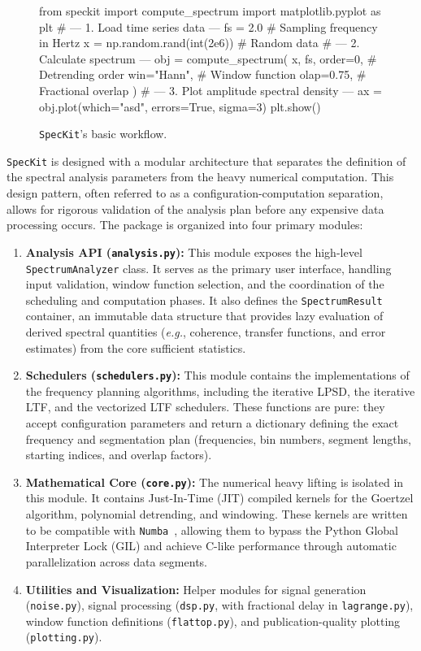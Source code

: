 \documentclass[final, 5p, times, twocolumn, number, sort&compress]{elsarticle}
\newcommand{\eg}{\textit{e.g.}}
\newcommand{\speckit}{\texttt{SpecKit}}
\begin{document}
\begin{figure}
\centering
\begin{python}
from speckit import compute_spectrum
import matplotlib.pyplot as plt
# --- 1. Load time series data ---
fs = 2.0  # Sampling frequency in Hertz
x = np.random.rand(int(2e6))  # Random data
# --- 2. Calculate spectrum ---
obj = compute_spectrum(
    x,
    fs,
    order=0,    # Detrending order
    win="Hann", # Window function
    olap=0.75,  # Fractional overlap
)
# --- 3. Plot amplitude spectral density ---
ax = obj.plot(which="asd", errors=True, sigma=3)
plt.show()
\end{python}
\caption{\speckit{}'s basic workflow.}
\label{fig:workflow}
\end{figure}

\speckit{} is designed with a modular architecture that separates the definition of the spectral analysis parameters from the heavy numerical computation. This design pattern, often referred to as a configuration-computation separation, allows for rigorous validation of the analysis plan before any expensive data processing occurs. The package is organized into four primary modules:

\begin{enumerate}
    \item \textbf{Analysis API (\texttt{analysis.py}):} This module exposes the high-level \texttt{SpectrumAnalyzer} class. It serves as the primary user interface, handling input validation, window function selection, and the coordination of the scheduling and computation phases. It also defines the \texttt{SpectrumResult} container, an immutable data structure that provides lazy evaluation of derived spectral quantities (\eg, coherence, transfer functions, and error estimates) from the core sufficient statistics.
    
    \item \textbf{Schedulers (\texttt{schedulers.py}):} This module contains the implementations of the frequency planning algorithms, including the iterative LPSD, the iterative LTF, and the vectorized LTF schedulers. These functions are pure: they accept configuration parameters and return a dictionary defining the exact frequency and segmentation plan (frequencies, bin numbers, segment lengths, starting indices, and overlap factors).
    
    \item \textbf{Mathematical Core (\texttt{core.py}):} The numerical heavy lifting is isolated in this module. It contains Just-In-Time (JIT) compiled kernels for the Goertzel algorithm, polynomial detrending, and windowing. These kernels are written to be compatible with \texttt{Numba}~\cite{Numba}, allowing them to bypass the Python Global Interpreter Lock (GIL) and achieve C-like performance through automatic parallelization across data segments.
    
    \item \textbf{Utilities and Visualization:} Helper modules for signal generation (\texttt{noise.py}), signal processing (\texttt{dsp.py}, with fractional delay in \texttt{lagrange.py}), window function definitions (\texttt{flattop.py}), and publication-quality plotting (\texttt{plotting.py}).
\end{enumerate}
\end{document}
